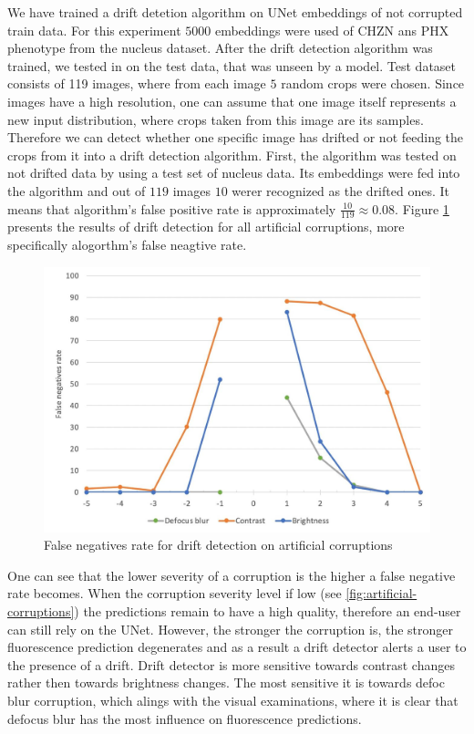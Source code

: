 We have trained a drift detetion algorithm on UNet embeddings of not corrupted train data. For this experiment $5000$ embeddings were used of CHZN ans PHX phenotype from the nucleus dataset. After the drift detection algorithm was trained, we tested in on the test data, that was unseen by a model. Test dataset consists of 119 images, where from each image $5$ random crops were chosen. Since images have a high resolution, one can assume that one image itself represents a new input distribution, where crops taken from this image are its samples. Therefore we can detect whether one specific image has drifted or not feeding the crops from it into a drift detection algorithm. First, the algorithm was tested on not drifted data by using a test set of nucleus data. Its embeddings were fed into the algorithm and out of $119$ images $10$ werer recognized as the drifted ones. It means that algorithm's false positive rate is approximately $\frac{10}{119} \approx 0.08$. Figure \ref{fig:fn-rate} presents the results of drift detection for all artificial corruptions, more specifically alogorthm's false neagtive rate.
\begin{figure}[H]
	\begin{center}
		\includegraphics[width=0.5\linewidth]{bilder/drift-detection/fn-rate.jpg}
		\caption{False negatives rate for drift detection on artificial corruptions}\label{fig:fn-rate}
	\end{center}
\end{figure}
One can see that the lower severity of a corruption is the higher a false negative rate becomes. When the corruption severity level if low (see \ref{fig:artificial-corruptions}) the predictions remain to have a high quality, therefore an end-user can still rely on the UNet. However, the stronger the corruption is, the stronger fluorescence prediction degenerates and as a result a drift detector alerts a user to the presence of a drift. Drift detector is more sensitive towards contrast changes rather then towards brightness changes. The most sensitive it is towards defoc blur corruption, which alings with the visual examinations, where it is clear that defocus blur has the most influence on fluorescence predictions.